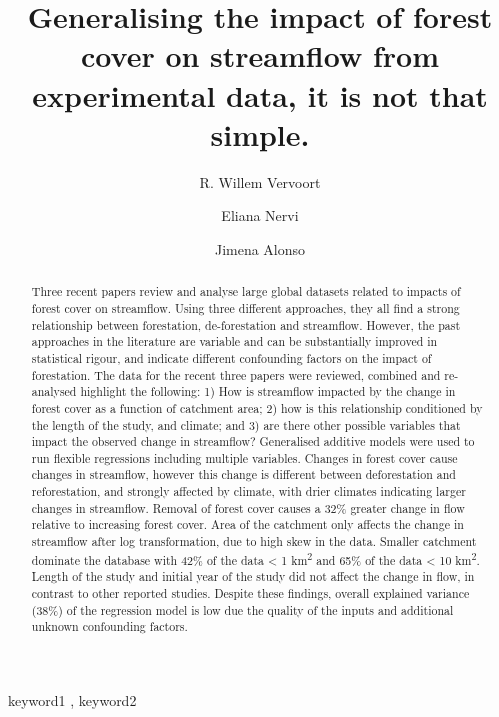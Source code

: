 \documentclass[]{elsarticle} %
\begin{document}
\begin{frontmatter}

  \title{Generalising the impact of forest cover on streamflow from experimental data, it is not that simple.}
    \author[a,b]{R. Willem Vervoort}
    \author[c]{Eliana Nervi}
    \author[d]{Jimena Alonso}
  
  \begin{abstract}
  Three recent papers review and analyse large global datasets related to impacts of forest cover on streamflow. Using three different approaches, they all find a strong relationship between forestation, de-forestation and streamflow. However, the past approaches in the literature are variable and can be substantially improved in statistical rigour, and indicate different confounding factors on the impact of forestation. The data for the recent three papers were reviewed, combined and re-analysed highlight the following: 1) How is streamflow impacted by the change in forest cover as a function of catchment area; 2) how is this relationship conditioned by the length of the study, and climate; and 3) are there other possible variables that impact the observed change in streamflow? Generalised additive models were used to run flexible regressions including multiple variables.
  Changes in forest cover cause changes in streamflow, however this change is different between deforestation and reforestation, and strongly affected by climate, with drier climates indicating larger changes in streamflow. Removal of forest cover causes a 32\% greater change in flow relative to increasing forest cover. Area of the catchment only affects the change in streamflow after log transformation, due to high skew in the data. Smaller catchment dominate the database with 42\% of the data \textless{} 1 km\textsuperscript{2} and 65\% of the data \textless{} 10 km\textsuperscript{2}. Length of the study and initial year of the study did not affect the change in flow, in contrast to other reported studies. Despite these findings, overall explained variance (38\%) of the regression model is low due the quality of the inputs and additional unknown confounding factors.
  \end{abstract}
    \begin{keyword}
    keyword1 \sep 
    keyword2
  \end{keyword}
  
 \end{frontmatter}
\end{document}
